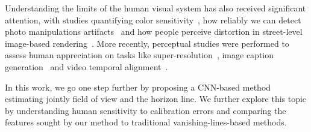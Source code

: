 Understanding the limits of the human visual system has also received significant attention, with studies quantifying color sensitivity~\cite{fairchild2013color}, how reliably we can detect photo manipulations artifacts~\cite{Farid2010} and how people perceive distortion in street-level image-based rendering~\cite{Vangorp2013}. More recently, perceptual studies were performed to assess human appreciation on tasks like super-resolution~\cite{ledig-cvpr-17}, image caption generation~\cite{vinyals-cvpr-15} and video temporal alignment~\cite{papazoglou-accv-16}.

In this work, we go one step further by proposing a CNN-based method estimating jointly field of view and the horizon line. We further explore this topic by understanding human sensitivity to calibration errors and comparing the features sought by our method to traditional vanishing-lines-based methods.
